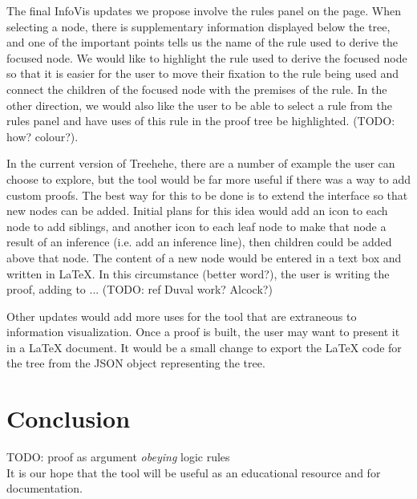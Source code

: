 \documentclass[conference]{IEEEtran}
\newcommand{\projectname}{Treehehe}
\begin{document}
The final InfoVis updates we propose involve the rules panel on the page. When selecting a node, there is supplementary information displayed below the tree, and one of the important points tells us the name of the rule used to derive the focused node. We would like to highlight the rule used to derive the focused node so that it is easier for the user to move their fixation to the rule being used and connect the children of the focused node with the premises of the rule. In the other direction, we would also like the user to be able to select a rule from the rules panel and have uses of this rule in the proof tree be highlighted. (TODO: how? colour?).

In the current version of \projectname{}, there are a number of example the user can choose to explore, but the tool would be far more useful if there was a way to add custom proofs. The best way for this to be done is to extend the interface so that new nodes can be added. Initial plans for this idea would add an icon to each node to add siblings, and another icon to each leaf node to make that node a result of an inference (i.e. add an inference line), then children could be added above that node. The content of a new node would be entered in a text box and written in \LaTeX{}. In this circumstance (better word?), the user is writing the proof, adding to ... (TODO: ref Duval work? Alcock?)

Other updates would add more uses for the tool that are extraneous to information visualization. Once a proof is built, the user may want to present it in a \LaTeX{} document. It would be a small change to export the \LaTeX{} code for the tree from the JSON object representing the tree.


\section{Conclusion}
\label{sec:conclusion}



TODO: proof as argument \textit{obeying} logic rules \\

It is our hope that the tool will be useful as an educational resource and for documentation.
\end{document}
